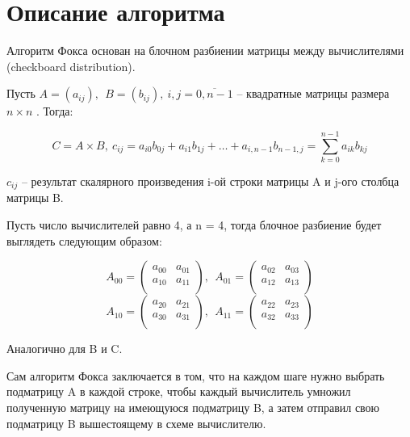 \documentclass{report}
\begin{document}
\newpage

\section*{Описание алгоритма}
Алгоритм Фокса основан на блочном разбиении матрицы между вычислителями (checkboard distribution).\par

Пусть  \( A= \left( a_{ij} \right) ,~~ B= \left( b_{ij} \right) ,~ i,j=\overline{0, n-1} \)  – квадратные матрицы размера  \( n \times n \) . Тогда:\par

 \[ C=A \times B,~ c_{ij}=a_{i0}b_{0j}+a_{i1}b_{1j}+ \ldots +a_{i,n-1}b_{n-1,j}= \sum _{k=0}^{n-1}a_{ik}b_{kj} \] \par

 \( c_{ij} \)  – результат скалярного произведения i-ой строки матрицы A и j-ого столбца матрицы B.\par

 Пусть число вычислителей равно 4, а n = 4, тогда блочное разбиение будет выглядеть следующим образом:\par

 \[ A_{00}= \left( \begin{matrix}
a_{00}  &  a_{01}\\
a_{10}  &  a_{11}\\
\end{matrix}
 \right) ,~~A_{01}= \left( \begin{matrix}
a_{02}  &   a_{03}\\
a_{12}  &   a_{13}\\
\end{matrix}
 \right)  \]  \[ A_{10}= \left( \begin{matrix}
a_{20}  &  a_{21}\\
a_{30}  &  a_{31}\\
\end{matrix}
 \right) ,~~A_{11}= \left( \begin{matrix}
a_{22}  &  a_{23}\\
a_{32}  &  a_{33}\\
\end{matrix}
 \right)  \] \par


\vspace{\baselineskip}
 Аналогично для B и C.\par

Сам алгоритм Фокса заключается в том, что на каждом шаге нужно выбрать подматрицу A в каждой строке, чтобы каждый вычислитель умножил полученную матрицу на имеющуюся подматрицу B, а затем отправил свою подматрицу B вышестоящему в схеме вычислителю.\par
\end{document}
